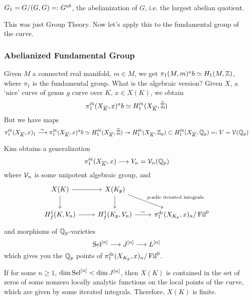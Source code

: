 \begin{ex}
$G_1= G/(G,G)=: G^{ab}$, the abelianization of $G$, i.e. the largest abelian quotient. 
\end{ex}


This was just Group Theory. Now let's apply this to the fundamental group of the curve.



\subsubsection{Abelianized Fundamental Group}

Given $M$ a connected real manifold, $m \in M$, we get $\pi_1(M,m)^ab \simeq H_1(M,\mathbb{Z})$, where $\pi_1$ is the fundamental group. What is the algebraic version? Given $X$, a `nice' curve of genus $g$ curve over $K$, $x \in X(K)$, we obtain
	\[
	\pi_1^{\text{\'et}}(X_{\overline{K}}, x)^ab \simeq H_1^{\text{\'et}}(X_{\overline{K}}, \widehat{\mathbb{Z}})
	\]
But we have maps
	\[
	\pi_1^{\text{\'et}}(X_{\overline{K}},x)_1 \stackrel{\sim}{\longrightarrow} \pi_1^{\text{\'et}}(X_{\overline{K}}, x)^ab \simeq H_1^{\text{\'et}}(X_{\overline{K}}, \widehat{\mathbb{Z}}) \twoheadrightarrow H_1^{\text{\'et}}(X_{\overline{K}}, \mathbb{Z}_p) \subset H_1^{\text{\'et}}(X_{\overline{K}}, \mathbb{Q}_p)=: V= \mathcal{V}(\mathbb{Q}_p)
	\]


Kim obtains a generalization
	\[
	\pi_1^{\text{\'et}}(X_{\overline{K}},x) \stackrel{}{\longrightarrow} V_n= \mathcal{V}_n(\mathbb{Q}_p)
	\]
where $\mathcal{V}_n$ is some unipotent algebraic group, and
	\[
	\begin{tikzcd}
	X(K) \arrow{d} \arrow{r} & X(K_\p) \arrow{d} \arrow{dr}{p\text{-adic iterated integrals}} \\
	H_f^1(K,V_n) \arrow{r} & H_f^1(K_\p,V_n) \arrow{r}{\sim} & \pi_1^\dr(X_{K_\p},x)_n/\Fil^0
	\end{tikzcd}
	\]
and morphisms of $\mathbb{Q}_p$-varieties
	\[
	\operatorname{Sel}^{[n]} \stackrel{}{\longrightarrow} J^{[n]} \stackrel{}{\longrightarrow} L^{[n]}
	\]
which gives you the $\mathbb{Q}_p$ points of $\pi_1^{\text{dr}}(X_{K_{\mathfrak{p}}},x)_n/\operatorname{Fil}^0$. 


\begin{thm}[Kim]
If for some $n \geq 1$, $\dim \operatorname{Sel}^{[n]} < \dim J^{[n]}$, then $X(K)$ is contained in the set of zeros of some nonzero locally analytic functions on the local points of the curve, which are given by some iterated integrals. Therefore, $X(K)$ is finite.
\end{thm}















